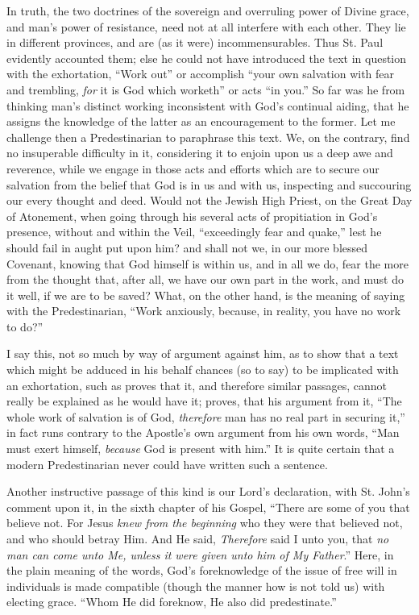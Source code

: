 In truth, the two doctrines of the sovereign and overruling power of
Divine grace, and man's power of resistance, need not at all interfere
with each other. They lie in different provinces, and are (as it were)
incommensurables. Thus St. Paul evidently accounted them; else he could
not have introduced the text in question with the exhortation,
``Work out'' or accomplish ``your own salvation with fear
and trembling, \emph{for} it is God which worketh'' or acts ``in
you.'' So far was he from thinking man's distinct working
inconsistent with God's continual aiding, that he assigns the knowledge
of the latter as an encouragement to the former. Let me challenge then a
Predestinarian to paraphrase this text. We, on the contrary, find no
insuperable difficulty in it, considering it to enjoin upon us a deep
awe and reverence, while we engage in those acts and efforts which are
to secure our salvation from the belief that God is in us and with us,
inspecting and succouring our every thought and deed. Would not the
Jewish High Priest, on the Great Day of Atonement, when going through
his several acts of propitiation in God's presence, without and within
the Veil, ``exceedingly fear and quake,'' lest he should fail in
aught put upon him? and shall not we, in our more blessed Covenant,
knowing that God himself is within us, and in all we do, fear the more
from the thought that, after all, we have our own part in the work, and
must do it well, if we are to be saved? What, on the other hand, is the
meaning of saying with the Predestinarian, ``Work anxiously,
because, in reality, you have no work to do?''

I say this, not so much by way of argument against him, as to show
that a text which might be adduced in his behalf chances (so to say) to
be implicated with an exhortation, such as proves that it, and therefore
similar passages, cannot really be explained as he would have it;
proves, that his argument from it, ``The whole work of salvation is
of God, \emph{therefore} man has no real part in securing it,'' in
fact runs contrary to the Apostle's own argument from his own words,
``Man must exert himself, \emph{because} God is present with
him.'' It is quite certain that a modern Predestinarian never could
have written such a sentence.

Another instructive passage of this kind is our Lord's declaration,
with St. John's comment upon it, in the sixth chapter of his Gospel,
``There are some of you that believe not. For Jesus \emph{knew from the
beginning} who they were that believed not, and who should betray
Him. And He said, \emph{Therefore} said I unto you, that \emph{no man can
come unto Me, unless it were given unto him of My Father}.''
Here, in the plain meaning of the words, God's foreknowledge of the
issue of free will in individuals is made compatible (though the manner
how is not told us) with electing grace. ``Whom He did foreknow, He
also did predestinate.''

